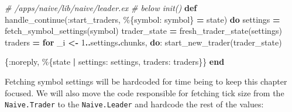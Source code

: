 \documentclass[
  oneside]{book}
\newenvironment{Shaded}{\begin{snugshade}}{\end{snugshade}}
\newcommand{\CommentTok}[1]{\textcolor[rgb]{0.56,0.35,0.01}{\textit{#1}}}
\newcommand{\DecValTok}[1]{\textcolor[rgb]{0.00,0.00,0.81}{#1}}
\newcommand{\KeywordTok}[1]{\textcolor[rgb]{0.13,0.29,0.53}{\textbf{#1}}}
\newcommand{\NormalTok}[1]{#1}
\newcommand{\OperatorTok}[1]{\textcolor[rgb]{0.81,0.36,0.00}{\textbf{#1}}}
\newcommand{\VariableTok}[1]{\textcolor[rgb]{0.00,0.00,0.00}{#1}}
\begin{document}
\begin{Shaded}
\begin{Highlighting}[]
  \CommentTok{\# /apps/naive/lib/naive/leader.ex}
  \CommentTok{\# below init()}
  \KeywordTok{def}\NormalTok{ handle\_continue(}\VariableTok{:start\_traders}\NormalTok{, \%\{}\VariableTok{symbol:}\NormalTok{ symbol\} }\OperatorTok{=}\NormalTok{ state) }\KeywordTok{do}
\NormalTok{    settings }\OperatorTok{=}\NormalTok{ fetch\_symbol\_settings(symbol)}
\NormalTok{    trader\_state }\OperatorTok{=}\NormalTok{ fresh\_trader\_state(settings)}
\NormalTok{    traders }\OperatorTok{=} \KeywordTok{for}\NormalTok{ \_i }\OperatorTok{\textless{}{-}} \DecValTok{1}\OperatorTok{..}\NormalTok{settings}\OperatorTok{.}\NormalTok{chunks,}
              \KeywordTok{do}\NormalTok{: start\_new\_trader(trader\_state)}

\NormalTok{    \{}\VariableTok{:noreply}\NormalTok{, \%\{state }\OperatorTok{|} \VariableTok{settings:}\NormalTok{ settings, }\VariableTok{traders:}\NormalTok{ traders\}\}}
  \KeywordTok{end}
\end{Highlighting}
\end{Shaded}

Fetching symbol settings will be hardcoded for time being to keep this chapter focused. We will also move the code responsible for fetching tick
size from the \texttt{Naive.Trader} to the \texttt{Naive.Leader} and hardcode the rest of the values:
\end{document}
